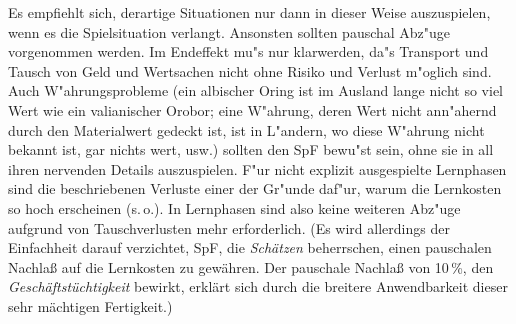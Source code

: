 \documentclass[10pt,a4paper,germanpar]{article}
\begin{document}
Es empfiehlt sich, derartige Situationen nur dann in dieser Weise
auszuspielen, wenn es die Spielsituation verlangt. Ansonsten sollten
pauschal Abz"uge vorgenommen werden. Im Endeffekt mu"s nur klarwerden,
da"s Transport und Tausch von Geld und Wertsachen nicht ohne Risiko
und Verlust m"oglich sind. Auch W"ahrungsprobleme (ein albischer Oring
ist im Ausland lange nicht so viel Wert wie ein valianischer Orobor;
eine W"ahrung, deren Wert nicht ann"ahernd durch den Materialwert
gedeckt ist, ist in L"andern, wo diese W"ahrung nicht bekannt ist, gar
nichts wert, usw.) sollten den SpF bewu"st sein, ohne sie in all ihren
nervenden Details auszuspielen. F"ur nicht explizit ausgespielte
Lernphasen sind die beschriebenen Verluste einer der Gr"unde daf"ur,
warum die Lernkosten so hoch erscheinen (s.\,o.). In Lernphasen sind
also keine weiteren Abz"uge aufgrund von Tauschverlusten mehr
erforderlich. (Es wird allerdings der Einfachheit darauf verzichtet,
SpF, die \emph{Schätzen} beherrschen, einen pauschalen Nachlaß auf die
Lernkosten zu gewähren. Der pauschale Nachlaß von 10\,\%, den
\emph{Geschäftstüchtigkeit} bewirkt, erklärt sich durch die breitere
Anwendbarkeit dieser sehr mächtigen Fertigkeit.)
\end{document}
